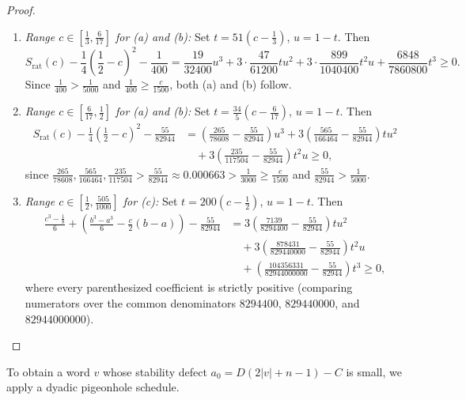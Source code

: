 \documentclass[11pt]{article}
\theoremstyle{definition}
\theoremstyle{remark}
\begin{document}
\begin{proof}
\begin{enumerate}[label=(\roman*), leftmargin=2em]
\begin{align*}
      + 5 \cdot \frac{151949}{1265625} t^4 u + \frac{371}{151875} t^5 \ge 0.
  \end{align*}
  Dividing by $48(1 + 8c^2) > 0$ yields $S_{\mathrm{rat}}(c) - p(c, x) \ge \frac{1}{5000}$.
  \item \emph{Range $c \in [\frac{1}{3}, \frac{6}{17}]$ for (a) and (b):} Set $t = 51(c - \frac{1}{3})$, $u = 1 - t$. Then
  \[
    S_{\mathrm{rat}}(c) - \frac{1}{4}\!\left(\frac{1}{2} - c\right)^2 - \frac{1}{400}
    = \frac{19}{32400} u^3 + 3\cdot \frac{47}{61200} t u^2 + 3\cdot \frac{899}{1040400} t^2 u + \frac{6848}{7860800} t^3 \ge 0.
  \]
  Since $\frac{1}{400} > \frac{1}{5000}$ and $\frac{1}{400} \ge \frac{c}{1500}$, both (a) and (b) follow.
  \item \emph{Range $c \in [\frac{6}{17}, \frac{1}{2}]$ for (a) and (b):} Set $t = \frac{34}{5}(c - \frac{6}{17})$, $u = 1 - t$. Then
  \begin{align*}
    S_{\mathrm{rat}}(c) - \frac{1}{4}\!\left(\frac{1}{2} - c\right)^2 - \frac{55}{82944}
    &= \left(\frac{265}{78608} - \frac{55}{82944}\right) u^3
      + 3\left(\frac{565}{166464} - \frac{55}{82944}\right) t u^2 \\
    &\quad + 3\left(\frac{235}{117504} - \frac{55}{82944}\right) t^2 u \ge 0,
  \end{align*}
  since $\frac{265}{78608}, \frac{565}{166464}, \frac{235}{117504} > \frac{55}{82944} \approx 0.000663 > \frac{1}{3000} \ge \frac{c}{1500}$ and $\frac{55}{82944} > \frac{1}{5000}$.
  \item \emph{Range $c \in [\frac{1}{2}, \frac{505}{1000}]$ for (c):} Set $t = 200(c - \frac{1}{2})$, $u = 1 - t$. Then
  \begin{align*}
    \frac{c^3 - \frac{1}{8}}{6} + \left(\frac{b^3 - a^3}{6} - \frac{c}{2}(b - a)\right) - \frac{55}{82944}
    &= 3\left(\frac{7139}{8294400} - \frac{55}{82944}\right) t u^2 \\
    &\quad + 3\left(\frac{878431}{829440000} - \frac{55}{82944}\right) t^2 u \\
    &\quad + \left(\frac{104356331}{82944000000} - \frac{55}{82944}\right) t^3 \ge 0,
  \end{align*}
  where every parenthesized coefficient is strictly positive (comparing numerators over the common denominators $8294400$, $829440000$, and $82944000000$). \qedhere
\end{enumerate}
\end{proof}

To obtain a word $v$ whose stability defect $a_0 = D(2|v| + n - 1) - C$ is small, we apply a dyadic pigeonhole schedule.
\end{document}
